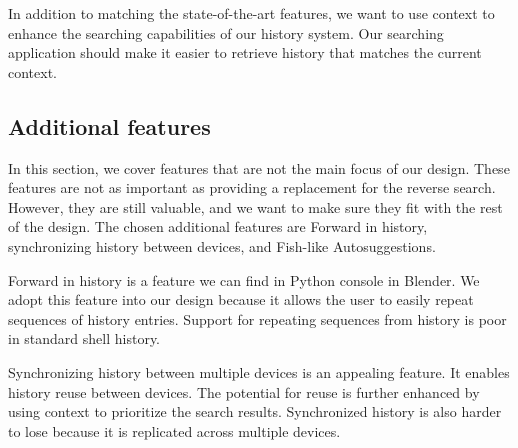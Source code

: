 
In addition to matching the state-of-the-art features, we want to use context to enhance the searching capabilities of our history system. Our searching application should make it easier to retrieve history that matches the current context. 





\subsection{Additional features}

In this section, we cover features that are not the main focus of our design. These features are not as important as providing a replacement for the reverse search. However, they are still valuable, and we want to make sure they fit with the rest of the design. 
The chosen additional features are Forward in history, synchronizing history between devices, and Fish-like Autosuggestions.




Forward in history is a feature we can find in Python console in Blender. We adopt this feature into our design because it allows the user to easily repeat sequences of history entries. Support for repeating sequences from history is poor in standard shell history.


Synchronizing history between multiple devices is an appealing feature. It enables history reuse between devices. The potential for reuse is further enhanced by using context to prioritize the search results.
Synchronized history is also harder to lose because it is replicated across multiple devices. 

